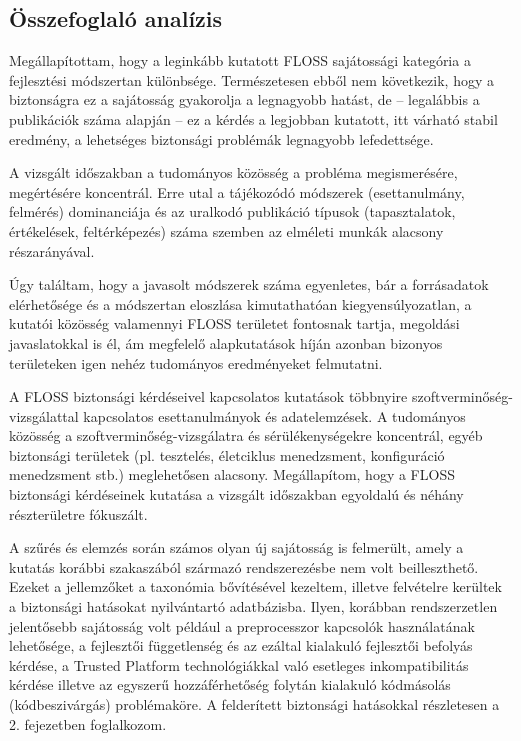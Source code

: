\documentclass[12pt,magyar,a4paper,oneside]{scrreprt}
\begin{document}
\hypertarget{uxf6sszefoglaluxf3-analuxedzis}{%
\subsection{Összefoglaló
analízis}\label{uxf6sszefoglaluxf3-analuxedzis}}

Megállapítottam, hogy a leginkább kutatott FLOSS sajátossági kategória a
fejlesztési módszertan különbsége. Természetesen ebből nem következik,
hogy a biztonságra ez a sajátosság gyakorolja a legnagyobb hatást, de --
legalábbis a publikációk száma alapján -- ez a kérdés a legjobban
kutatott, itt várható stabil eredmény, a lehetséges biztonsági problémák
legnagyobb lefedettsége.

A vizsgált időszakban a tudományos közösség a probléma megismerésére,
megértésére koncentrál. Erre utal a tájékozódó módszerek (esettanulmány,
felmérés) dominanciája és az uralkodó publikáció típusok (tapasztalatok,
értékelések, feltérképezés) száma szemben az elméleti munkák alacsony
részarányával.

Úgy találtam, hogy a javasolt módszerek száma egyenletes, bár a
forrásadatok elérhetősége és a módszertan eloszlása kimutathatóan
kiegyensúlyozatlan, a kutatói közösség valamennyi FLOSS területet
fontosnak tartja, megoldási javaslatokkal is él, ám megfelelő
alapkutatások híján azonban bizonyos területeken igen nehéz tudományos
eredményeket felmutatni.

A FLOSS biztonsági kérdéseivel kapcsolatos kutatások többnyire
szoftverminőség-vizsgálattal kapcsolatos esettanulmányok és
adatelemzések. A tudományos közösség a szoftverminőség-vizsgálatra és
sérülékenységekre koncentrál, egyéb biztonsági területek (pl. tesztelés,
életciklus menedzsment, konfiguráció menedzsment stb.) meglehetősen
alacsony. Megállapítom, hogy a FLOSS biztonsági kérdéseinek kutatása a
vizsgált időszakban egyoldalú és néhány részterületre fókuszált.

A szűrés és elemzés során számos olyan új sajátosság is felmerült, amely
a kutatás korábbi szakaszából származó rendszerezésbe nem volt
beilleszthető. Ezeket a jellemzőket a taxonómia bővítésével kezeltem,
illetve felvételre kerültek a biztonsági hatásokat nyilvántartó
adatbázisba. Ilyen, korábban rendszerzetlen jelentősebb sajátosság volt
például a preprocesszor kapcsolók használatának lehetősége, a fejlesztői
függetlenség és az ezáltal kialakuló fejlesztői befolyás kérdése, a
Trusted Platform technológiákkal való esetleges inkompatibilitás kérdése
illetve az egyszerű hozzáférhetőség folytán kialakuló kódmásolás
(kódbeszivárgás) problémaköre. A felderített biztonsági hatásokkal
részletesen a 2. fejezetben foglalkozom.
\end{document}
